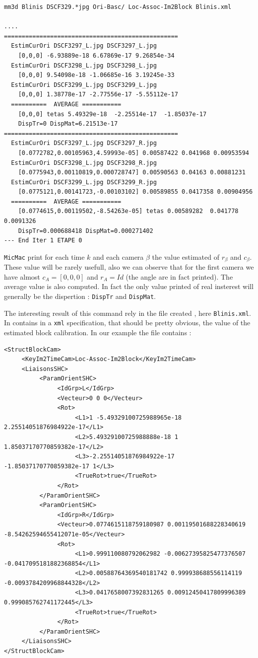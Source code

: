 \begin{verbatim}
mm3d Blinis DSCF329.*jpg Ori-Basc/ Loc-Assoc-Im2Block Blinis.xml

....
=================================================
  EstimCurOri DSCF3297_L.jpg DSCF3297_L.jpg
    [0,0,0] -6.93889e-18 6.67869e-17 9.26854e-34
  EstimCurOri DSCF3298_L.jpg DSCF3298_L.jpg
    [0,0,0] 9.54098e-18 -1.06685e-16 3.19245e-33
  EstimCurOri DSCF3299_L.jpg DSCF3299_L.jpg
    [0,0,0] 1.38778e-17 -2.77556e-17 -5.55112e-17
  ==========  AVERAGE =========== 
    [0,0,0] tetas 5.49329e-18  -2.25514e-17  -1.85037e-17
    DispTr=0 DispMat=6.21513e-17
=================================================
  EstimCurOri DSCF3297_L.jpg DSCF3297_R.jpg
    [0.0772782,0.00105963,4.59993e-05] 0.00587422 0.041968 0.00953594
  EstimCurOri DSCF3298_L.jpg DSCF3298_R.jpg
    [0.0775943,0.00110819,0.000728747] 0.00590563 0.04163 0.00881231
  EstimCurOri DSCF3299_L.jpg DSCF3299_R.jpg
    [0.0775121,0.00141723,-0.00103102] 0.00589855 0.0417358 0.00904956
  ==========  AVERAGE =========== 
    [0.0774615,0.00119502,-8.54263e-05] tetas 0.00589282  0.041778  0.0091326
    DispTr=0.000688418 DispMat=0.000271402
--- End Iter 1 ETAPE 0
\end{verbatim}

{\tt MicMac} print for each time $k$ and each camera $\beta$ the value estimated of 
$r_\beta$ and $c_\beta$.  These value will be rarely usefull, also we can observe that
for the first camera we have almost $c_A=[0,0,0]$ and $r_A=Id$ (the angle are 
in fact printed). The average value is also computed. In fact the only value printed
of real insterest will generally be the dispertion :  {\tt  DispTr} and {\tt DispMat}.

The interesting result of this command rely in the file created , here {\tt Blinis.xml}.
In contains in a {\tt xml} specification, that should be pretty obvious, the value
of the estimated block calibration.
In our example the file contains :


\begin{verbatim}
<StructBlockCam>
     <KeyIm2TimeCam>Loc-Assoc-Im2Block</KeyIm2TimeCam>
     <LiaisonsSHC>
          <ParamOrientSHC>
               <IdGrp>L</IdGrp>
               <Vecteur>0 0 0</Vecteur>
               <Rot>
                    <L1>1 -5.49329100725988965e-18 2.25514051876984922e-17</L1>
                    <L2>5.49329100725988888e-18 1 1.85037170770859382e-17</L2>
                    <L3>-2.25514051876984922e-17 -1.85037170770859382e-17 1</L3>
                    <TrueRot>true</TrueRot>
               </Rot>
          </ParamOrientSHC>
          <ParamOrientSHC>
               <IdGrp>R</IdGrp>
               <Vecteur>0.0774615118759180987 0.00119501688228340619 -8.54262594655412071e-05</Vecteur>
               <Rot>
                    <L1>0.999110080792062982 -0.00627395825477376507 -0.0417095181882368854</L1>
                    <L2>0.00588764369540181742 0.999938688556114119 -0.0093784209968844328</L2>
                    <L3>0.0417658007392831265 0.00912450417809996389 0.999085762741172445</L3>
                    <TrueRot>true</TrueRot>
               </Rot>
          </ParamOrientSHC>
     </LiaisonsSHC>
</StructBlockCam>

\end{verbatim}

